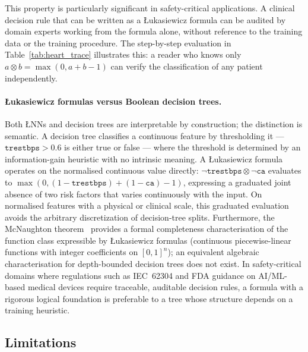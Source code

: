 \documentclass[12pt,a4paper]{article}
\newcommand{\tnorm}{\otimes}      %
\newcommand{\LNN}{\L{}NN}
\begin{document}
This property is particularly significant in safety-critical applications.
A clinical decision rule that can be written as a \L{}ukasiewicz formula can
be audited by domain experts working from the formula alone, without reference
to the training data or the training procedure.
The step-by-step evaluation in Table~\ref{tab:heart_trace} illustrates this:
a reader who knows only $a \tnorm b = \max(0, a+b-1)$ can verify the
classification of any patient independently.

\paragraph{\L{}ukasiewicz formulas versus Boolean decision trees.}
Both \LNN{}s and decision trees are interpretable by construction; the
distinction is semantic.
A decision tree classifies a continuous feature by thresholding it ---
$\mathtt{trestbps} > 0.6$ is either true or false --- where the threshold
is determined by an information-gain heuristic with no intrinsic meaning.
A \L{}ukasiewicz formula operates on the normalised continuous value
directly: $\neg\mathtt{trestbps} \tnorm \neg\mathtt{ca}$ evaluates to
$\max(0,(1-\mathtt{trestbps})+(1-\mathtt{ca})-1)$, expressing a graduated
joint absence of two risk factors that varies continuously with the input.
On normalised features with a physical or clinical scale, this graduated
evaluation avoids the arbitrary discretization of decision-tree splits.
Furthermore, the McNaughton theorem~\cite{mcnaughton1951} provides a formal
completeness characterisation of the function class expressible by
\L{}ukasiewicz formulas (continuous piecewise-linear functions with integer
coefficients on $[0,1]^n$); an equivalent algebraic characterisation for
depth-bounded decision trees does not exist.
In safety-critical domains where regulations such as IEC~62304 and FDA
guidance on AI/ML-based medical devices require traceable, auditable
decision rules, a formula with a rigorous logical foundation is preferable
to a tree whose structure depends on a training heuristic.

\subsection{Limitations}
\end{document}
